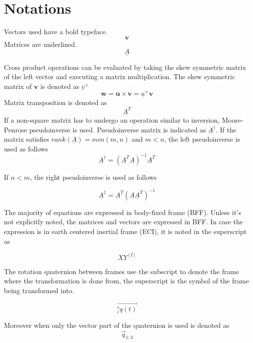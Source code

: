 \section*{Notations}

Vectors used have a bold typeface.  
\begin{equation*}
\textbf{v}
\end{equation*}
Matrices are underlined.
\begin{equation*}
\underline{A}
\end{equation*}

Cross product operations can be evaluated by taking the skew symmetric matrix of the left vector and executing a matrix multiplication. The skew symmetric matrix of $\textbf{v}$ is denoted as $\underline{v}^\times$
\begin{equation*}
	\textbf{w} = \textbf{u} \times \textbf{v} = \underline{u}^\times \textbf{v}
\end{equation*}
Matrix transposition is denoted as
\begin{equation*}
\underline{A}^T
\end{equation*}
If a non-square matrix has to undergo an operation similar to inversion, Moore-Penrose pseudoinverse is used. Pseudoinverse matrix is indicated as $\underline{A}^\dagger$. If the matrix satisfies $rank(\underline{A}) = min(m,n)$ and $m < n$, the left pseudoinverse is used as follows
\begin{equation*}
\underline{A}^\dagger    =   (\underline{A}^T \underline{A} )^{-1} \underline{A}^T 
\end{equation*}

If $n < m$, the right pseudoinverse is used as follows

\begin{equation*}
 \underline{A}^\dagger    =  \underline{A}^T  (\underline{A} \underline{A}^T)^{-1}
\end{equation*}


The majority of equations are expressed in body-fixed frame (BFF). Unless it's not explicitly noted, the matrices and vectors are expressed in BFF. In case the expression is in earth centered inertial frame (ECI), it is noted in the superscript as 

\begin{equation*}
XY^{[I]}
\end{equation*}

The rotation quaternion between frames use the subscript to denote the frame where the transformation is done from, the superscript is the symbol of the frame being transformed into.

\begin{equation*}
\vec{^s_i q(t)}
\end{equation*}

Moreover when only the vector part of the quaternion is used is denoted as 
\begin{equation*}
\vec{q}_{1:3}
\end{equation*}
